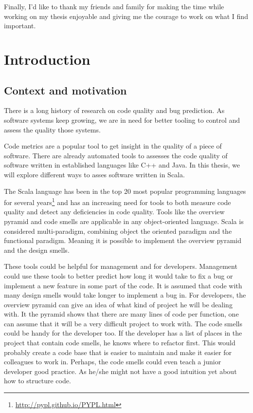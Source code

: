 \documentclass[onecolumn]{article}
\let\oldsection\section
\renewcommand\section{\clearpage\oldsection}
\begin{document}
Finally, I'd like to thank my friends and family for making the time while working on my thesis enjoyable and giving me the courage to work on what I find important.



\tableofcontents

\section{Introduction}

\subsection{Context and motivation}
There is a long history of research on code quality and bug prediction. As software systems keep growing, we are in need for better tooling to control and assess the quality those systems.

Code metrics are a popular tool to get insight in the quality of a piece of software. There are already automated tools to assesses the code quality of software written in established languages like C++ and Java. In this thesis, we will explore different ways to asses software written in Scala.

The Scala language has been in the top 20 most popular programming languages for several years\footnote{\url{http://pypl.github.io/PYPL.html}} and has an increasing need for tools to both measure code quality and detect any deficiencies in code quality. Tools like the overview pyramid and code smells are applicable in any object-oriented language. Scala is considered multi-paradigm, combining object the oriented paradigm and the functional paradigm. Meaning it is possible to implement the overview pyramid and the design smells.

These tools could be helpful for management and for developers. Management could use these tools to better predict how long it would take to fix a bug or implement a new feature in some part of the code. It is assumed that code with many design smells would take longer to implement a bug in. For developers, the overview pyramid can give an idea of what kind of project he will be dealing with. It the pyramid shows that there are many lines of code per function, one can assume that it will be a very difficult project to work with. The code smells could be handy for the developer too. If the developer has a list of places in the project that contain code smells, he knows where to refactor first. This would probably create a code base that is easier to maintain and make it easier for colleagues to work in. Perhaps, the code smells could even teach a junior developer good practice. As he/she might not have a good intuition yet about how to structure code.
\end{document}
